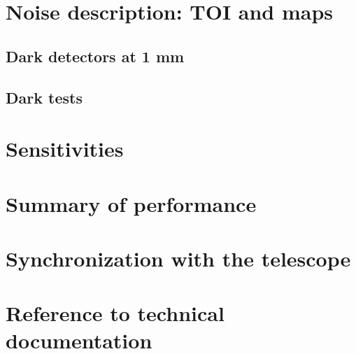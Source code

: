 \documentclass[a4paper, 11pt]{article} %
\begin{document}
\section{Noise description: TOI and maps}
\label{se:noise}

\subsection{Dark detectors at 1 mm}

\clearpage
\subsection{Dark tests}
\label{se:dark}



\section{Sensitivities}
\label{se:nefd}


\clearpage
\section{Summary of performance}
\label{se:summary}


\clearpage
\begin{appendix}

  \section{Synchronization with the telescope}
  \label{ap:synchro}
  
  
  \section{Reference to technical documentation}
  \label{ap:doc}
  

\end{appendix}
\end{document}
